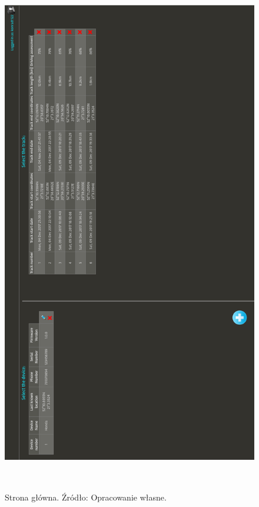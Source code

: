 \begin{figure}[H]
	\centering
	\includegraphics[height=23cm, width=16cm]{img/software/website/main_screen.png}
	\caption{Strona główna. Źródło: Opracowanie własne.}
	\label{fig:image_soft_website_main_page}
\end{figure}

